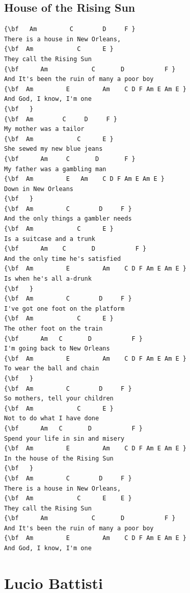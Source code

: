 \documentclass[a4paper]{article}
\begin{document}
\subsection{House of the Rising Sun}
\begin{multicols}{2}\begin{Verbatim}[commandchars=\\\{\}]
{\bf   Am         C        D     F }
There is a house in New Orleans, 
{\bf  Am            C      E }
They call the Rising Sun 
{\bf      Am            C       D           F }
And It's been the ruin of many a poor boy 
{\bf  Am         E         Am    C D F Am E Am E }
And God, I know, I'm one 
{\bf   }
{\bf  Am        C     D     F }
My mother was a tailor 
{\bf  Am            C      E }
She sewed my new blue jeans 
{\bf      Am     C       D       F }
My father was a gambling man 
{\bf  Am         E   Am    C D F Am E Am E }
Down in New Orleans 
{\bf   }
{\bf  Am         C        D     F }
And the only things a gambler needs 
{\bf  Am            C      E }
Is a suitcase and a trunk 
{\bf      Am    C       D           F }
And the only time he's satisfied 
{\bf  Am         E         Am    C D F Am E Am E }
Is when he's all a-drunk 
{\bf   }
{\bf  Am         C        D     F }
I've got one foot on the platform 
{\bf  Am            C      E }
The other foot on the train 
{\bf      Am   C       D           F }
I'm going back to New Orleans 
{\bf  Am         E         Am    C D F Am E Am E }
To wear the ball and chain 
{\bf   }
{\bf  Am         C        D     F }
So mothers, tell your children 
{\bf  Am            C      E }
Not to do what I have done 
{\bf      Am   C       D           F }
Spend your life in sin and misery 
{\bf  Am         E         Am    C D F Am E Am E }
In the house of the Rising Sun 
{\bf   }
{\bf  Am         C        D     F }
There is a house in New Orleans, 
{\bf  Am            C      E    E }
They call the Rising Sun 
{\bf      Am            C       D           F }
And It's been the ruin of many a poor boy 
{\bf  Am         E         Am    C D F Am E Am E }
And God, I know, I'm one 

\end{Verbatim}
\end{multicols}\newpage
\section{Lucio Battisti}
\end{document}
